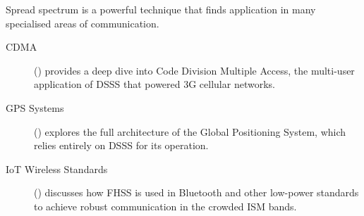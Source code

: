 \begin{importantbox}[title={Further Reading}]
    Spread spectrum is a powerful technique that finds application in many specialised areas of communication.
    \begin{description}
        \item[CDMA] () provides a deep dive into Code Division Multiple Access, the multi-user application of DSSS that powered 3G cellular networks.
        \item[GPS Systems] () explores the full architecture of the Global Positioning System, which relies entirely on DSSS for its operation.
        \item[IoT Wireless Standards] () discusses how FHSS is used in Bluetooth and other low-power standards to achieve robust communication in the crowded ISM bands.
    \end{description}
\end{importantbox}
